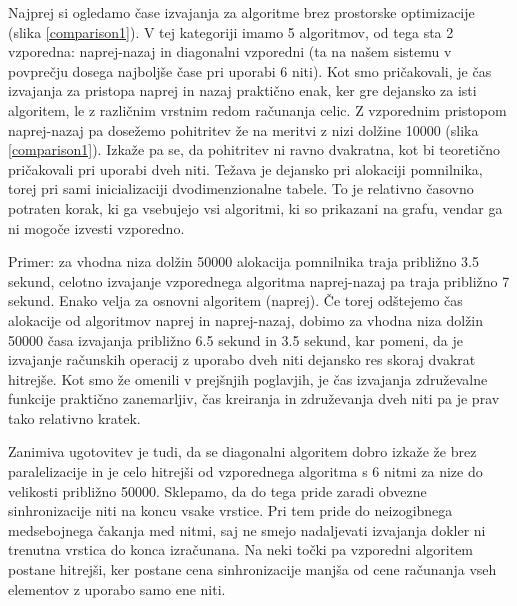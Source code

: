 \documentclass[a4paper,12pt,openright]{book}
\begin{document}
Najprej si ogledamo čase izvajanja za algoritme brez prostorske optimizacije (slika \ref{comparison1}). V tej kategoriji imamo 5 algoritmov, od tega sta 2 vzporedna: naprej-nazaj in diagonalni vzporedni (ta na našem sistemu v povprečju dosega najboljše čase pri uporabi 6 niti). Kot smo pričakovali, je čas izvajanja za pristopa naprej in nazaj praktično enak, ker gre dejansko za isti algoritem, le z različnim vrstnim redom računanja celic. Z vzporednim pristopom naprej-nazaj pa dosežemo pohitritev že na meritvi z nizi dolžine 10000 (slika \ref{comparison1}). Izkaže pa se, da pohitritev ni ravno dvakratna, kot bi teoretično pričakovali pri uporabi dveh niti. Težava je dejansko pri alokaciji pomnilnika, torej pri sami inicializaciji dvodimenzionalne tabele. To je relativno časovno potraten korak, ki ga vsebujejo vsi algoritmi, ki so prikazani na grafu, vendar ga ni mogoče izvesti vzporedno. 

Primer: za vhodna niza dolžin 50000 alokacija pomnilnika traja približno 3.5 sekund, celotno izvajanje vzporednega algoritma naprej-nazaj pa traja približno 7 sekund. Enako velja za osnovni algoritem (naprej). Če torej odštejemo čas alokacije od algoritmov naprej in naprej-nazaj, dobimo za vhodna niza dolžin 50000 časa izvajanja približno 6.5 sekund in 3.5 sekund, kar pomeni, da je izvajanje računskih operacij z uporabo dveh niti dejansko res skoraj dvakrat hitrejše. Kot smo že omenili v prejšnjih poglavjih, je čas izvajanja združevalne funkcije praktično zanemarljiv, čas kreiranja in združevanja dveh niti pa je prav tako relativno kratek. 

Zanimiva ugotovitev je tudi, da se diagonalni algoritem dobro izkaže že brez paralelizacije in je celo hitrejši od vzporednega algoritma s 6 nitmi za nize do velikosti približno 50000. Sklepamo, da do tega pride zaradi obvezne sinhronizacije niti na koncu vsake vrstice. Pri tem pride do neizogibnega medsebojnega čakanja med nitmi, saj ne smejo nadaljevati izvajanja dokler ni trenutna vrstica do konca izračunana. Na neki točki pa vzporedni algoritem postane hitrejši, ker postane cena sinhronizacije manjša od cene računanja vseh elementov z uporabo samo ene niti. 
\end{document}
